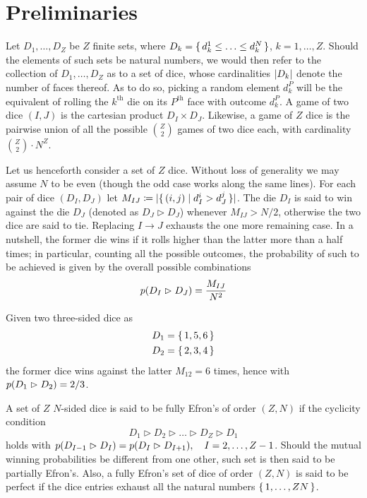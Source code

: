 \section{Preliminaries}
Let $D_1,\ldots,D_{Z}$ be $Z$ finite sets, 
where $D_k=\set{d_k^1\leq\ldots \leq d_k^N}$, $k=1,\ldots,Z$.
Should the elements of such sets be natural numbers, we would then refer
to the collection of $D_1,\ldots,D_{Z}$ as to a set of dice, 
whose cardinalities $\lvert D_k\rvert$ denote the number of faces thereof. 
As to do so, picking a random element $d_k^P$ will be the equivalent
of rolling the $k^{\textrm{th}}$ die on its $P^{\textrm{th}}$ 
face with outcome $d_k^P$. A game of two dice $(I,J)$ is the cartesian product $D_I\times D_J$. Likewise, a game of $Z$ dice is the pairwise union of all the
possible $\binom{Z}{2}$ games of two dice each, with cardinality $\binom{Z}{2}\cdot N^Z$.

\bigskip
Let us henceforth consider a set of $Z$ dice. Without loss of generality we may
assume $N$ to be even (though the odd case works along the same lines). 
For each pair of dice $(D_I,D_J)$ let 
$M_{IJ}\coloneqq \lvert\set{(i,j)\mid d_I^i>d_J^j}\rvert$. The die $D_I$ is said
to win against the die $D_J$ (denoted as $D_J\vartriangleright D_J$)    
whenever $M_{IJ}>N/2$, otherwise the two dice are
said to tie. Replacing $I\to J$ exhausts the one more remaining case. In a nutshell,
the former die wins if it rolls higher than the latter more than a half times; in particular, counting all the possible outcomes, the probability of such to be achieved is given by the overall possible combinations 
\[
p(D_{I}\vartriangleright D_{J})=\frac{M_{IJ}}{N^2}
\]
\begin{example}
Given two three-sided dice as 
\begin{align*}
D_1&=\set{1,5,6} \\
D_2&=\set{2,3,4} 
\end{align*}
the former dice wins against the latter $M_{12}=6$ times,
hence with $p(D_{1}\vartriangleright D_{2})=2/3$.
\end{example}
\begin{definition}
A set of $Z$ $N$-sided dice is said to be fully Efron's of order $(Z,N)$ 
if the cyclicity condition
\[
D_1\vartriangleright D_2\vartriangleright \ldots \vartriangleright
D_Z\vartriangleright D_1
\]
holds with $p(D_{I-1}\vartriangleright D_{I})=p(D_{I}\vartriangleright D_{I+1}), \quad I=2,\ldots,Z-1$. Should the 
mutual winning probabilities be different from one other, such set is 
then said to be partially Efron's. Also, a fully Efron's set of dice
of order $(Z,N)$ is said to be perfect if the dice entries exhaust
all the natural numbers $\set{1,\ldots,ZN}$.
\end{definition}